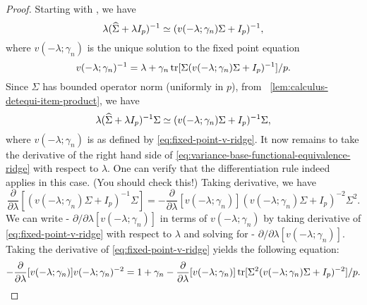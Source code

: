 \documentclass{article}
\begin{document}
\begin{proof}
    Starting with
    ,
    we have
    \[
        \lambda ({\widehat{\Sigma}} + \lambda I_p)^{-1}
        \simeq (v(-\lambda; \gamma_n) \Sigma + I_p)^{-1},
    \]
  where $v(-\lambda; \gamma_n)$ is the unique solution to the fixed point equation
  \begin{equation}
        \label{eq:fixed-point-v-ridge}
        v(-\lambda; \gamma_n)^{-1}
        = \lambda + \gamma_n \operatorname{tr}[\Sigma (v(-\lambda; \gamma_n) \Sigma + I_p)^{-1}] / p.
  \end{equation}
   Since $\Sigma$ has bounded operator norm (uniformly in $p$),
   from 
    ~\eqref{lem:calculus-detequi-item-product},
   we have
  \begin{equation}
        \label{eq:variance-base-functional-equivalence-ridge}
        \lambda ({\widehat{\Sigma}} + \lambda I_p)^{-1} \Sigma
        \simeq (v(-\lambda; \gamma_n) \Sigma + I_p)^{-1} \Sigma,
  \end{equation}
  where $v(-\lambda; \gamma_n)$ is as defined by \eqref{eq:fixed-point-v-ridge}.
    It now remains to take the derivative of 
    the right hand side of \eqref{eq:variance-base-functional-equivalence-ridge}
    with respect to $\lambda$.
    One can verify that the differentiation rule indeed applies in this case.
    (You should check this!)
    Taking derivative,
    we have
    \begin{equation}
        \label{eq:deriv-detequi-genvar-ridge}
        \frac{\partial}{\partial \lambda}
        [(v(-\lambda; \gamma_n) \Sigma + I_p)^{-1} \Sigma]
        = - \frac{\partial}{\partial \lambda}[v(-\lambda; \gamma_n)]
        (v(-\lambda; \gamma_n) \Sigma + I_p)^{-2} \Sigma^2.
    \end{equation}
    We can write 
    - $\partial / \partial \lambda [v(-\lambda; \gamma_n)]$
    in terms of $v(-\lambda; \gamma_n)$
    by taking derivative of \eqref{eq:fixed-point-v-ridge}
    with respect to $\lambda$
    and solving for 
    - $\partial / \partial \lambda [v(-\lambda; \gamma_n)]$.
    Taking the derivative of \eqref{eq:fixed-point-v-ridge} yields
    the following equation:
    \begin{equation}
        - \label{eq:deriv-relation-v-ridge}
        \frac{\partial}{\partial \lambda} [v(-\lambda; \gamma_n)]
        v(-\lambda; \gamma_n)^{-2}
        =  1 + \gamma_n - \frac{\partial}{\partial \lambda}[v(-\lambda; \gamma_n)] 
        \operatorname{tr}[\Sigma^2 (v(-\lambda; \gamma_n) \Sigma + I_p)^{-2}] / p.
    \end{equation}

\end{proof}
\end{document}

